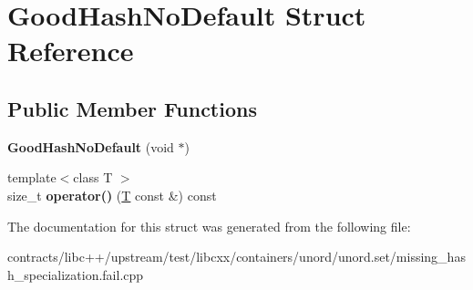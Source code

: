 \hypertarget{struct_good_hash_no_default}{}\section{Good\+Hash\+No\+Default Struct Reference}
\label{struct_good_hash_no_default}
\subsection*{Public Member Functions}
\begin{DoxyCompactItemize}
\item 
\mbox{\label{struct_good_hash_no_default_ac2cd548bbf0a040523a63e88d8f817fe}} 
{\bfseries Good\+Hash\+No\+Default} (void $\ast$)
\item 
\mbox{\label{struct_good_hash_no_default_aa30e7eb7b253856f2b03b4564856232d}} 
{\footnotesize template$<$class T $>$ }\\size\+\_\+t {\bfseries operator()} (\mbox{\hyperlink{struct_t}{T}} const \&) const
\end{DoxyCompactItemize}


The documentation for this struct was generated from the following file\+:\begin{DoxyCompactItemize}
\item 
contracts/libc++/upstream/test/libcxx/containers/unord/unord.\+set/missing\+\_\+hash\+\_\+specialization.\+fail.\+cpp\end{DoxyCompactItemize}
